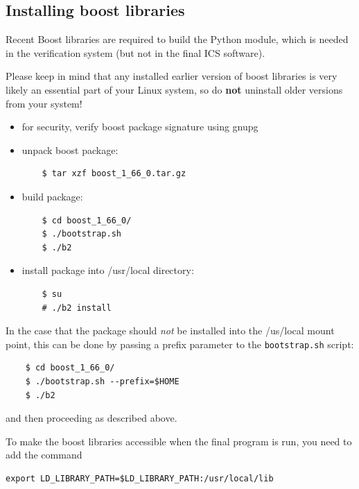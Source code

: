 \documentclass[fontsize=12,a4paper]{scrreprt}
\begin{document}
\subsection{Installing boost libraries}
Recent Boost libraries are required to build the Python module, which
is needed in the verification system (but not in the final ICS
software).

Please keep in mind that any installed earlier version of boost
libraries is very likely an essential part of your Linux system, so do
\textbf{not} uninstall older versions from your system!

\begin{itemize}
\item for security, verify boost package signature using gnupg

\item unpack boost package:

  \begin{verbatim}
    $ tar xzf boost_1_66_0.tar.gz
  \end{verbatim}

\item build package:

  \begin{verbatim}
    $ cd boost_1_66_0/
    $ ./bootstrap.sh
    $ ./b2
  \end{verbatim}


\item install package into /usr/local directory:

  \begin{verbatim}
    $ su
    # ./b2 install
  \end{verbatim}
\end{itemize}

In the case that the package  should \emph{not} be installed
into the /us/local mount point, this can be done by passing
a prefix parameter to the \texttt{bootstrap.sh} script:

  \begin{verbatim}
    $ cd boost_1_66_0/
    $ ./bootstrap.sh --prefix=$HOME
    $ ./b2
  \end{verbatim}

  and then proceeding as described above.


To make the boost libraries accessible when the
final program is run, you need to add the
command

\begin{verbatim}
export LD_LIBRARY_PATH=$LD_LIBRARY_PATH:/usr/local/lib
\end{verbatim}
\end{document}
